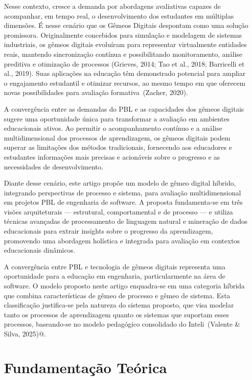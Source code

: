 \documentclass[english, spanish, brazilian]{modelo_dt}
\begin{document}
Nesse contexto, cresce a demanda por abordagens avaliativas capazes de acompanhar, em tempo real, o desenvolvimento dos estudantes em múltiplas dimensões. É nesse cenário que os Gêmeos Digitais despontam como uma solução promissora. Originalmente concebidos para simulação e modelagem de sistemas industriais, os gêmeos digitais evoluíram para representar virtualmente entidades reais, mantendo sincronização contínua e possibilitando monitoramento, análise preditiva e otimização de processos (Grieves, 2014; Tao et al., 2018; Barricelli et al., 2019). Suas aplicações na educação têm demonstrado potencial para ampliar o engajamento estudantil e otimizar recursos, ao mesmo tempo em que oferecem novas possibilidades para avaliação formativa~(Zacher, 2020).

A convergência entre as demandas do PBL e as capacidades dos gêmeos digitais sugere uma oportunidade única para transformar a avaliação em ambientes educacionais ativos. Ao permitir o acompanhamento contínuo e a análise multidimensional dos processos de aprendizagem, os gêmeos digitais podem superar as limitações dos métodos tradicionais, fornecendo aos educadores e estudantes informações mais precisas e acionáveis sobre o progresso e as necessidades de desenvolvimento.

Diante desse cenário, este artigo propõe um modelo de gêmeo digital híbrido, integrando perspectivas de processo e sistema, para avaliação multidimensional em projetos PBL de engenharia de software. A proposta fundamenta-se em três visões arquiteturais — estrutural, comportamental e de processo — e utiliza técnicas avançadas de processamento de linguagem natural e mineração de dados educacionais para extrair insights sobre o progresso da aprendizagem, promovendo uma abordagem holística e integrada para avaliação em contextos educacionais dinâmicos.

A convergência entre PBL e tecnologia de gêmeos digitais representa uma oportunidade para a educação em engenharia, particularmente na área de software\@. O modelo proposto neste artigo enquadra-se em uma categoria híbrida que combina características de gêmeo de processo e gêmeo de sistema\@. Esta classificação justifica-se pela natureza do sistema proposto, que visa modelar tanto os processos de aprendizagem quanto os sistemas que suportam esses processos, baseando-se no modelo pedagógico consolidado do Inteli~(Valente & Silva, 2025)@.

\section{Fundamentação Teórica}
\end{document}
